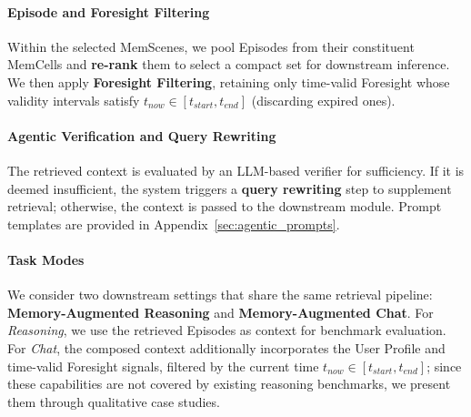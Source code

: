 \paragraph{Episode and Foresight Filtering} Within the selected MemScenes, we pool Episodes from their constituent MemCells and \textbf{re-rank} them to select a compact set for downstream inference. We then apply \textbf{Foresight Filtering}, retaining only time-valid Foresight whose validity intervals satisfy $t_{now}\in[t_{start}, t_{end}]$ (discarding expired ones).

\paragraph{Agentic Verification and Query Rewriting} The retrieved context is evaluated by an LLM-based verifier for sufficiency. If it is deemed insufficient, the system triggers a \textbf{query rewriting} step to supplement retrieval; otherwise, the context is passed to the downstream module. Prompt templates are provided in Appendix~\ref{sec:agentic_prompts}.

\paragraph{Task Modes} We consider two downstream settings that share the same retrieval pipeline: \textbf{Memory-Augmented Reasoning} and \textbf{Memory-Augmented Chat}. For \textit{Reasoning}, we use the retrieved Episodes as context for benchmark evaluation. For \textit{Chat}, the composed context additionally incorporates the User Profile and time-valid Foresight signals, filtered by the current time $t_{now}\in[t_{start}, t_{end}]$; since these capabilities are not covered by existing reasoning benchmarks, we present them through qualitative case studies.